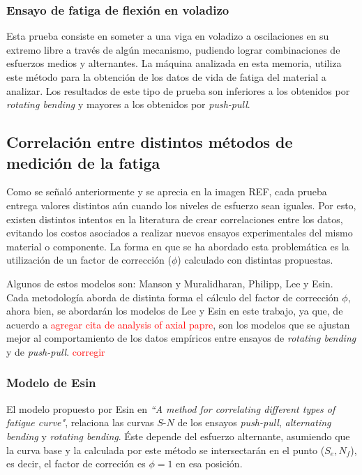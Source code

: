 \subsubsection{Ensayo de fatiga de flexión en voladizo}
Esta prueba consiste en someter a una viga en voladizo a oscilaciones en su extremo libre a través de algún mecanismo, pudiendo lograr combinaciones de esfuerzos medios y alternantes. La máquina analizada en esta memoria, utiliza este método para la obtención de los datos de vida de fatiga del material a analizar. Los resultados de este tipo de prueba son inferiores a los obtenidos por \textit{rotating bending} y mayores a los obtenidos por \textit{push-pull}.

\subsection{Correlación entre distintos métodos de medición de la fatiga}
Como se señaló anteriormente y se aprecia en la imagen REF, cada prueba entrega valores distintos aún cuando los niveles de esfuerzo sean iguales. Por esto, existen distintos intentos en la literatura de crear correlaciones entre los datos, evitando los costos asociados a realizar nuevos ensayos experimentales del mismo material o componente. La forma en que se ha abordado esta problemática es la utilización de un factor de corrección ($\phi$) calculado con distintas propuestas.

Algunos de estos modelos son: Manson y Muralidharan, Philipp, Lee y Esin. Cada metodología aborda de distinta forma el cálculo del factor de corrección $\phi$, ahora bien, se abordarán los modelos de Lee y Esin en este trabajo, ya que, de acuerdo a \textcolor{red}{agregar cita de analysis of axial papre}, son los modelos que se ajustan mejor al comportamiento de los datos empíricos entre ensayos de \textit{rotating bending} y de \textit{push-pull}. \textcolor{red}{corregir}

\subsubsection{Modelo de Esin}
El modelo propuesto por Esin en \textit{``A method for correlating different types of fatigue curve"}, relaciona las curvas $S$-$N$ de los ensayos \textit{push-pull}, \textit{alternating bending} y \textit{rotating bending}. Éste depende del esfuerzo alternante, asumiendo que la curva base y la calculada por este método se intersectarán en el punto ($S_e,N_f$), es decir, el factor de correción es $\phi=1$ en esa posición. 

